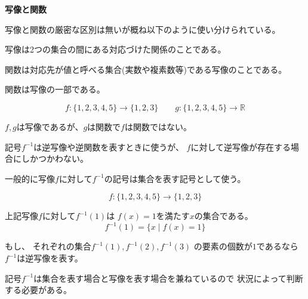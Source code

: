 \documentclass[12pt,b5paper]{ltjsarticle}
\begin{document}
\textbf{写像と関数}

写像と関数の厳密な区別は無いが概ね以下のように使い分けられている。

\dotfill

写像は2つの集合の間にある対応づけた関係のことである。

関数は対応先が値と呼べる集合(実数や複素数等)である写像のことである。


関数は写像の一部である。


\begin{equation}
 f:\{1,2,3,4,5\}\rightarrow \{1,2,3\}
  \qquad
 g:\{1,2,3,4,5\}\rightarrow \mathbb{R}
\end{equation}

$f,g$は写像であるが、$g$は関数で$f$は関数ではない。


\hrulefill

記号$f^{-1}$は逆写像や逆関数を表すときに使うが、
$f$に対して逆写像が存在する場合にしかつかわない。


一般的に写像$f$に対して$f^{-1}$の記号は集合を表す記号として使う。

\begin{equation}
 f:\{1,2,3,4,5\}\rightarrow \{1,2,3\}
\end{equation}

上記写像$f$に対して$f^{-1}(1)$は
$f(x)=1$を満たす$x$の集合である。
\begin{equation}
f^{-1}(1) = \{x \mid f(x)=1\}
\end{equation}

もし、
それぞれの集合$f^{-1}(1),f^{-1}(2),f^{-1}(3)$
の要素の個数が$1$であるなら$f^{-1}$は逆写像を表す。


記号$f^{-1}$は集合を表す場合と写像を表す場合を兼ねているので
状況によって判断する必要がある。
\end{document}
